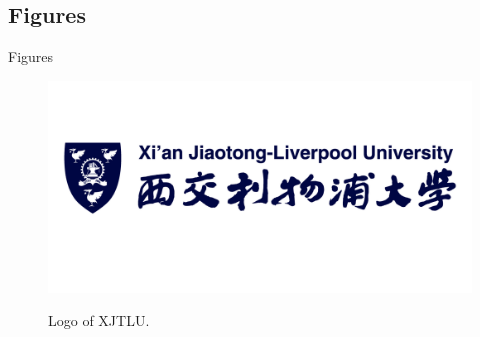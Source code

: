 \documentclass{libs/XJTLU_format}
\begin{document}


\subsection{Figures}
\begin{frame}{Figures}
    \begin{figure}
        \centering
        \caption{Logo of XJTLU.}
        \includegraphics[scale=0.5]{libs/XJTLU_logo.png}
        \label{fig:XJTLU_logo}
    \end{figure}
\end{frame}
\end{document}
